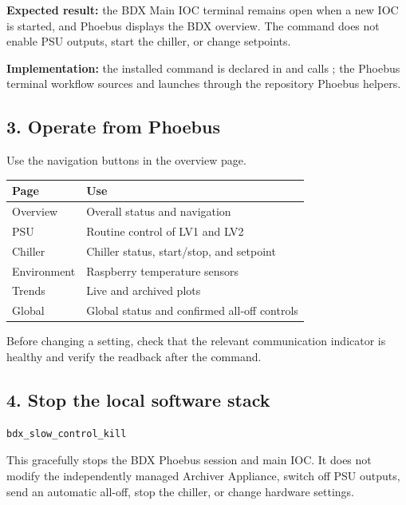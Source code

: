 \documentclass[11pt]{article}
\begin{document}
\textbf{Expected result:} the BDX Main IOC terminal remains open when a new IOC is started, and Phoebus displays the BDX overview. The command does not enable PSU outputs, start the chiller, or change setpoints.

\textbf{Implementation:} the installed command is declared in  and calls ; the Phoebus terminal workflow sources  and launches through the repository Phoebus helpers.

\subsection*{3. Operate from Phoebus}

Use the navigation buttons in the overview page.

\begin{center}
\begin{tabularx}{\textwidth}{@{}l X@{}}
\toprule
Page & Use \\
\midrule
Overview & Overall status and navigation \\
PSU & Routine control of LV1 and LV2 \\
Chiller & Chiller status, start/stop, and setpoint \\
Environment & Raspberry temperature sensors \\
Trends & Live and archived plots \\
Global & Global status and confirmed all-off controls \\
\bottomrule
\end{tabularx}
\end{center}

Before changing a setting, check that the relevant communication indicator is healthy and verify the readback after the command.

\subsection*{4. Stop the local software stack}

\begin{lstlisting}[style=shell]
bdx_slow_control_kill
\end{lstlisting}

This gracefully stops the BDX Phoebus session and main IOC. It does not modify the independently managed Archiver Appliance, switch off PSU outputs, send an automatic all-off, stop the chiller, or change hardware settings.
\end{document}

